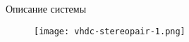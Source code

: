\begin{frame}{Описание системы}
\begin{figure}
        \texttt{[image: vhdc-stereopair-1.png]}
\end{figure}
\end{frame}